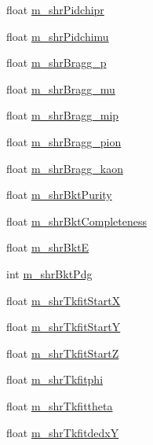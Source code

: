 \begin{DoxyCompactItemize}
float \hyperlink{classselection_1_1CCincSelection_a23975eb02710fef71c363a9dd8ed808b}{m\-\_\-shr\-Pidchipr}
\item 
float \hyperlink{classselection_1_1CCincSelection_a01f6b4b35c15cf072e082eee58665bd0}{m\-\_\-shr\-Pidchimu}
\item 
float \hyperlink{classselection_1_1CCincSelection_a9c533f6915b180797d90b4ad789ffb39}{m\-\_\-shr\-Bragg\-\_\-p}
\item 
float \hyperlink{classselection_1_1CCincSelection_abe0da2d66394a9583d9540f83a114901}{m\-\_\-shr\-Bragg\-\_\-mu}
\item 
float \hyperlink{classselection_1_1CCincSelection_a0d588b58345d52cc13a398bb3f6ff2fd}{m\-\_\-shr\-Bragg\-\_\-mip}
\item 
float \hyperlink{classselection_1_1CCincSelection_aeb3ad1e13e9e94fb9096d40f8c576a6a}{m\-\_\-shr\-Bragg\-\_\-pion}
\item 
float \hyperlink{classselection_1_1CCincSelection_a44d88e3b197705450db2becfae327827}{m\-\_\-shr\-Bragg\-\_\-kaon}
\item 
float \hyperlink{classselection_1_1CCincSelection_a95079e8ae0cb7d55594d64812d24327c}{m\-\_\-shr\-Bkt\-Purity}
\item 
float \hyperlink{classselection_1_1CCincSelection_ae50845633aef1725ac8c894101041f54}{m\-\_\-shr\-Bkt\-Completeness}
\item 
float \hyperlink{classselection_1_1CCincSelection_a0a43f7b976987cc6d13389a589c561e2}{m\-\_\-shr\-Bkt\-E}
\item 
int \hyperlink{classselection_1_1CCincSelection_aa11fee829a174ef4b6f92041edb990cf}{m\-\_\-shr\-Bkt\-Pdg}
\item 
float \hyperlink{classselection_1_1CCincSelection_a0bab1ed8cdf12861136bd47a6d48c7ad}{m\-\_\-shr\-Tkfit\-Start\-X}
\item 
float \hyperlink{classselection_1_1CCincSelection_aeff05af138a16a516e5413e21b6bcdf1}{m\-\_\-shr\-Tkfit\-Start\-Y}
\item 
float \hyperlink{classselection_1_1CCincSelection_a9c1c8138a2febe952478d15845ca8846}{m\-\_\-shr\-Tkfit\-Start\-Z}
\item 
float \hyperlink{classselection_1_1CCincSelection_af760bcbc586c53183f9ed2d5359b028a}{m\-\_\-shr\-Tkfitphi}
\item 
float \hyperlink{classselection_1_1CCincSelection_a9fa1d825a900a4081323091daa9b0aa7}{m\-\_\-shr\-Tkfittheta}
\item 
float \hyperlink{classselection_1_1CCincSelection_aa619cb73a3bb42251eaf5b35445e788b}{m\-\_\-shr\-Tkfitdedx\-Y}

\end{DoxyCompactItemize}
